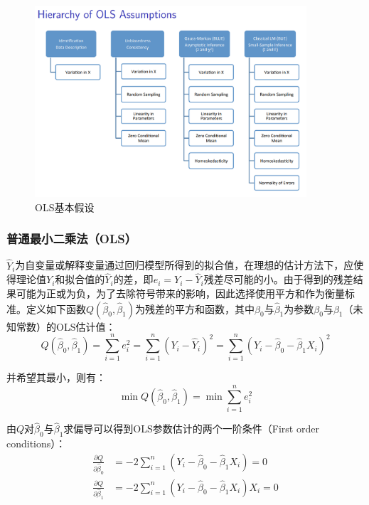 \documentclass[11pt]{article}
\begin{document}
\begin{figure}[H]
    \centering
    \includegraphics[width=0.9\textwidth]{fig/ols-assumptions.png}
    \caption{OLS基本假设}
    \label{fig:ols-assumptions}
\end{figure}

\subsubsection{普通最小二乘法（OLS）}

$\hat{Y}_i$为自变量或解释变量通过回归模型所得到的拟合值，在理想的估计方法下，应使得理论值$Y_i$和拟合值的$\hat{Y}_i$的差，即$e_i = Y_i - \hat{Y}_i$残差尽可能的小。由于得到的残差结果可能为正或为负，为了去除符号带来的影响，因此选择使用平方和作为衡量标准。定义如下函数$Q(\hat{\beta}_0, \hat{\beta}_1)$为残差的平方和函数，其中$\hat{\beta}_0$与$\hat{\beta}_1$为参数$\beta_0$与$\beta_1$（未知常数）的OLS估计值：
\begin{equation*}
    Q(\hat{\beta}_0, \hat{\beta}_1)
    = \sum_{i=1}^{n} e_i^2
    = \sum_{i=1}^{n} \left( Y_i - \hat{Y}_i \right)^2
    = \sum_{i=1}^{n} \left( Y_i - \hat{\beta}_0 - \hat{\beta}_1 X_i \right)^2
\end{equation*}

并希望其最小，则有：
\begin{equation*}
    \min Q(\hat{\beta}_0, \hat{\beta}_1) = \min \sum_{i=1}^{n} e_i^2
\end{equation*}

由$Q$对$\hat{\beta}_0$与$\hat{\beta}_1$求偏导可以得到OLS参数估计的两个一阶条件（First order conditions）：
\begin{align*}
    \frac{\partial Q}{\partial \hat{\beta}_0} &= -2 \sum_{i=1}^{n} \left( Y_i - \hat{\beta}_0 - \hat{\beta}_1 X_i \right) = 0 \\
    \frac{\partial Q}{\partial \hat{\beta}_1} &= -2 \sum_{i=1}^{n} \left( Y_i - \hat{\beta}_0 - \hat{\beta}_1 X_i \right) X_i = 0
\end{align*}
\end{document}
